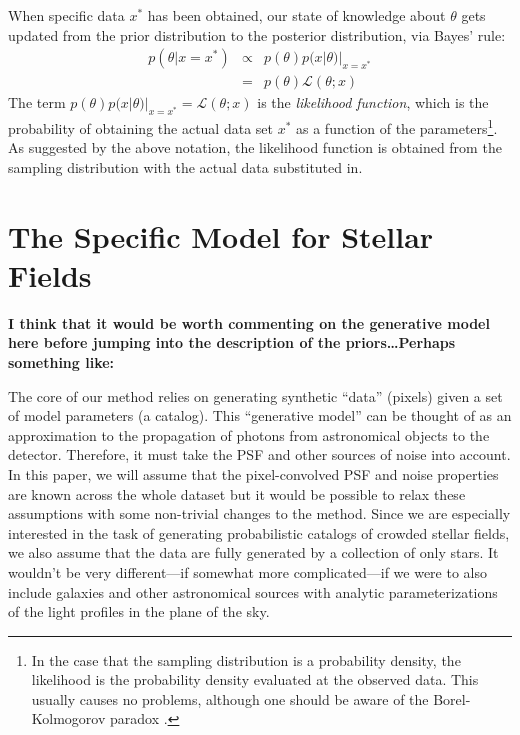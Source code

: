 \documentclass[letterpaper, 11pt]{article}
\begin{document}
When specific data $x^*$ has been obtained, our state of knowledge about $\theta$
gets updated from the prior distribution to the posterior distribution,
via Bayes' rule:
\begin{eqnarray}
p(\theta|x=x^*) &\propto& p(\theta)p(x|\theta)|_{x=x^*} \\
&=& p(\theta)\mathcal{L}(\theta; x)
\end{eqnarray}
The term $p(\theta)p(x|\theta)|_{x=x^*} = \mathcal{L}(\theta; x)$
is the {\it likelihood function}, which is the
probability of obtaining the actual data set $x^*$ as a function of the
parameters\footnote{In the case that the sampling distribution is a probability
density, the likelihood is the probability density evaluated at the observed
data. This usually causes no problems, although one should be aware of the
Borel-Kolmogorov paradox \citep{jaynes}.}.
As suggested by the above notation, the likelihood function is obtained from the
sampling distribution with the actual data substituted in.

\section{The Specific Model for Stellar Fields}

{\bf I think that it would be worth commenting on the generative model here
before jumping into the description of the priors\ldots Perhaps something
like:}

The core of our method relies on generating synthetic ``data'' (pixels) given
a set of model parameters (a catalog). This ``generative model'' can be
thought of as an approximation to the propagation of photons from
astronomical objects to the detector. Therefore, it must take the
PSF and other sources of noise into account. In this paper, we will assume
that the pixel-convolved PSF and noise properties are known across the whole
dataset but it would be possible to relax these assumptions with some
non-trivial changes to the method. Since we are especially interested in
the task of generating probabilistic catalogs of crowded stellar fields,
we also assume that the data are fully generated by a collection of only
stars. It wouldn't be very different---if somewhat more complicated---if we
were to also include galaxies and other astronomical sources with analytic
parameterizations of the light profiles in the plane of the sky.
\end{document}
